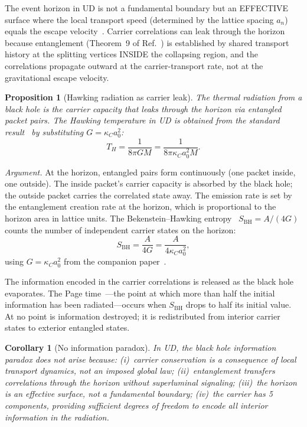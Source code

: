\documentclass[11pt,twocolumn]{article}
\newtheorem{corollary}{Corollary}
\newtheorem{proposition}{Proposition}
\begin{document}
The event horizon in UD is not a fundamental boundary but an EFFECTIVE surface where the local transport speed (determined by the lattice spacing $a_n$) equals the escape velocity~\cite{einstein1915}.
Carrier correlations can leak through the horizon because entanglement (Theorem~9 of Ref.~\cite{mayes2026ud}) is established by shared transport history at the splitting vertices INSIDE the collapsing region, and the correlations propagate outward at the carrier-transport rate, not at the gravitational escape velocity.

\begin{proposition}[Hawking radiation as carrier leak]
The thermal radiation from a black hole is the carrier capacity that leaks through the horizon via entangled packet pairs.
The Hawking temperature in UD is obtained from the standard result~\cite{hawking1975} by substituting $G=\kappa_C a_0^2$:
\begin{equation}
T_H = \frac{1}{8\pi G M} = \frac{1}{8\pi\kappa_C a_0^2 M}.
\end{equation}
\end{proposition}

\textit{Argument.}
At the horizon, entangled pairs form continuously (one packet inside, one outside).
The inside packet's carrier capacity is absorbed by the black hole; the outside packet carries the correlated state away.
The emission rate is set by the entanglement creation rate at the horizon, which is proportional to the horizon area in lattice units.
The Bekenstein--Hawking entropy~\cite{bekenstein1973} $S_{\mathrm{BH}}=A/(4G)$ counts the number of independent carrier states on the horizon:
\begin{equation}
S_{\mathrm{BH}} = \frac{A}{4G} = \frac{A}{4\kappa_C a_0^2},
\end{equation}
using $G=\kappa_C a_0^2$ from the companion paper~\cite{mayes2026ud}.

The information encoded in the carrier correlations is released as the black hole evaporates.
The Page time~\cite{page1993}---the point at which more than half the initial information has been radiated---occurs when $S_{\mathrm{BH}}$ drops to half its initial value.
At no point is information destroyed; it is redistributed from interior carrier states to exterior entangled states.

\begin{corollary}[No information paradox]
In UD, the black hole information paradox does not arise because:
(i)~carrier conservation is a consequence of local transport dynamics, not an imposed global law;
(ii)~entanglement transfers correlations through the horizon without superluminal signaling;
(iii)~the horizon is an effective surface, not a fundamental boundary;
(iv)~the carrier has 5 components, providing sufficient degrees of freedom to encode all interior information in the radiation.
\end{corollary}
\end{document}
